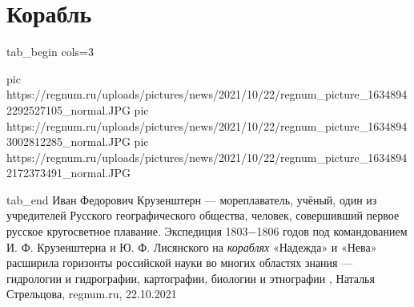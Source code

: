  
 
 
 
 
\chapter{Корабль}


\ifcmt
  tab_begin cols=3

     pic https://regnum.ru/uploads/pictures/news/2021/10/22/regnum_picture_16348942292527105_normal.JPG
     pic https://regnum.ru/uploads/pictures/news/2021/10/22/regnum_picture_16348943002812285_normal.JPG
		 pic https://regnum.ru/uploads/pictures/news/2021/10/22/regnum_picture_16348942172373491_normal.JPG

  tab_end
\fi
Иван Федорович Крузенштерн — мореплаватель, учёный, один из учредителей
Русского географического общества, человек, совершивший первое русское
кругосветное плавание. Экспедиция 1803−1806 годов под командованием И. Ф.
Крузенштерна и Ю. Ф. Лисянского на \emph{кораблях} «Надежда» и «Нева» расширила
горизонты российской науки во многих областях знания — гидрологии и
гидрографии, картографии, биологии и этнографии
, 
Наталья Стрельцова, regnum.ru, 22.10.2021

